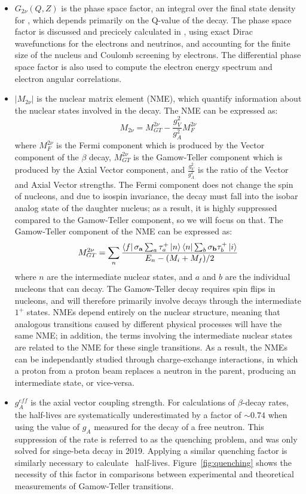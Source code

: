 \documentclass[/main.tex]{subfiles}
\begin{document}
\begin{itemize}
\item $G_{2\nu}(Q,Z)$ is the phase space factor, an integral over the final state density for \tnbb, which depends primarily on the Q-value of the decay.
  The phase space factor is discussed and precicely calculated in \cite{Kotila2012, mirea2015, stoica2019}, using exact Dirac wavefunctions for the electrons and neutrinos, and accounting for the finite size of the nucleus and Coulomb screening by electrons.
  The differential phase space factor is also used to compute the electron energy spectrum and electron angular correlations.
\item $|M_{2\nu}|$ is the nuclear matrix element (NME), which quantify information about the nuclear states involved in the decay.
  The NME can be expressed as:
  \begin{equation}
    M_{2\nu}=M^{2\nu}_{GT} - \frac{g_V^2}{g_A^2}M^{2\nu}_F
  \end{equation}
  where $M^{2\nu}_F$ is the Fermi component which is produced by the Vector component of the $\beta$ decay, $M^{2\nu}_{GT}$ is the Gamow-Teller component which is produced by the Axial Vector component, and $\frac{g_V^2}{g_A^2}$ is the ratio of the Vector and Axial Vector strengths.
  The Fermi component does not change the spin of nucleons, and due to isospin invariance, the decay must fall into the isobar analog state of the daughter nucleus; as a result, it is highly suppressed compared to the Gamow-Teller component, so we will focus on that.
  The Gamow-Teller component of the NME can be expressed as:
  \begin{equation}
    M^{2\nu}_{GT}=\sum_n\frac{\bra{f}\mathbf{\sigma_a}\sum_a\tau^+_a\ket{n}\bra{n}\sum_b\mathbf{\sigma_b}\tau^+_b\ket{i}}{E_n-(M_i+M_f)/2}
  \end{equation}
  where $n$ are the intermediate nuclear states, and $a$ and $b$ are the individual nucleons that can decay.
  The Gamow-Teller decay requires spin flips in nucleons, and will therefore primarily involve decays through the intermediate $1^+$ states.
  NMEs depend entirely on the nuclear structure, meaning that analogous transitions caused by different physical processes will have the same NME; in addition, the terms involving the intermediate nuclear states are related to the NME for these single transitions.
  As a result, the NMEs can be independantly studied through charge-exchange interactions, in which a proton from a proton beam replaces a neutron in the parent, producing an intermediate state, or vice-versa.
\item $g^{eff}_A$ is the axial vector coupling strength.
  For calculations of $\beta$-decay rates, the half-lives are systematically underestimated by a factor of ${\sim}0.74$ when using the value of $g_A$ measured for the decay of a free neutron.
  This suppression of the rate is referred to as the quenching problem, and was only solved for singe-beta decay in 2019\cite{Gysbers2019}.
  Applying a similar quenching factor is similarly necessary to calculate \tnbb\ half-lives.
  Figure~\ref{fig:quenching} shows the necessity of this factor in comparisons between experimental and theoretical measurements of Gamow-Teller transitions.
\end{itemize}
\end{document}
